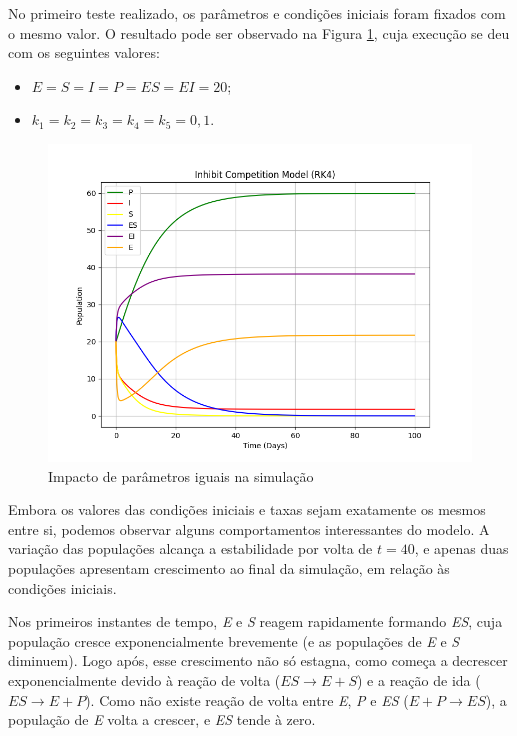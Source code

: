 \documentclass[a4paper, 12pt]{article}
\begin{document}
No primeiro teste realizado, os parâmetros e condições iniciais foram fixados com o mesmo valor. O resultado pode ser observado na Figura \ref{fig:exampleFig10}, cuja execução se deu com os seguintes valores:

\begin{itemize}
    \item \(E = S = I = P = ES = EI = 20\);
    \item \(k_1 = k_2 = k_3 = k_4 = k_5 = 0,1\).
\end{itemize}

\vspace*{-1cm}

\begin{figure}[H]
    \centering
    \includegraphics[width=1\textwidth]{Images/Exercise 3/same.png}
    \vspace*{-1cm}
    \caption{Impacto de parâmetros iguais na simulação}
    \label{fig:exampleFig10}
\end{figure}

Embora os valores das condições iniciais e taxas sejam exatamente os mesmos entre si, podemos observar alguns comportamentos interessantes do modelo. A variação das populações alcança a estabilidade por volta de \(t = 40\), e apenas duas populações apresentam crescimento ao final da simulação, em relação às condições iniciais.

Nos primeiros instantes de tempo, \emph{E} e \emph{S} reagem rapidamente formando \emph{ES}, cuja população cresce exponencialmente brevemente (e as populações de \emph{E} e \emph{S} diminuem). Logo após, esse crescimento não só estagna, como começa a decrescer exponencialmente devido à reação de volta (\(ES \rightarrow E + S\)) e a reação de ida (\(ES \rightarrow E + P\)). Como não existe reação de volta entre \emph{E}, \emph{P} e \emph{ES} (\(E + P \rightarrow ES\)), a população de \emph{E} volta a crescer, e \emph{ES} tende à zero.
\end{document}
